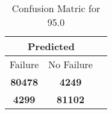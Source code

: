\begin{table}[] 
\label{Table: Prediction Accuracy-DMD95.0OnlySunEKF-ignoreReflection-Reflection} 
\caption{Confusion Matric for 95.0} 
\centering 
\begin{tabular} 
 {@{}ccc@{}} 
\toprule 
\multicolumn{2}{c}{\textbf{Predicted}}
 \\ \midrule 
\multicolumn{1}{|c|}{Failure} & 
\multicolumn{1}{c|}{No Failure}
 \\ \midrule 
\multicolumn{1}{|c|}{\color{green}\textbf{80478}} & 
\multicolumn{1}{c|}{\color{red}\textbf{4249}}
 \\ \midrule 
\multicolumn{1}{|c|}{\color{red}\textbf{4299}} & 
\multicolumn{1}{c|}{\color{green}\textbf{81102}}
 \\ \bottomrule 
\end{tabular} 
\end{table} 

